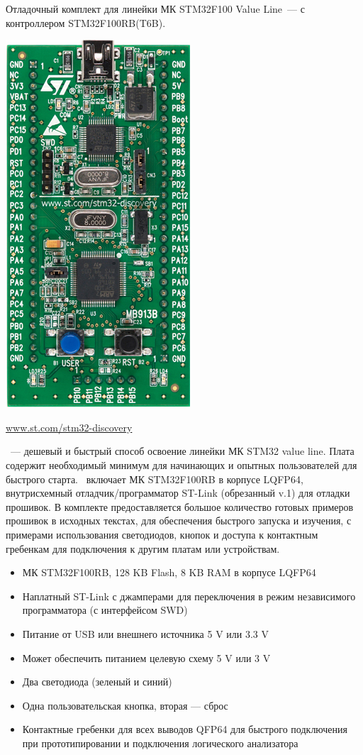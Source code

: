  \label{stm32f1} \secdown


Отладочный комплект для линейки МК STM32F100 Value 
Line\ --- с контроллером STM32F100RB(T6B).

\includegraphics[height=0.7\textheight]{vendors/STM32VLDISCOVERY.jpg}

\url{www.st.com/stm32-discovery}
\bigskip

\vld\ --- дешевый и быстрый способ освоение линейки МК STM32 
value line. 
Плата содержит необходимый минимум для начинающих и опытных пользователей
для быстрого старта.
\vld\ включает МК STM32F100RB в корпусе LQFP64, внутрисхемный 
отладчик/программатор ST-Link (обрезанный v.1) для отладки прошивок.
В комплекте предоставляется большое количество готовых примеров прошивок
в исходных текстах, для обеспечения быстрого запуска и изучения, с примерами
использования светодиодов, кнопок и доступа к контактным гребенкам
для подключения к другим платам или устройствам.

\bigskip
\begin{itemize}
\item МК STM32F100RB, 128 KB Flash, 8 KB RAM в корпусе LQFP64
\item Наплатный ST-Link с джамперами для переключения в режим независимого 
программатора (с интерфейсом SWD)
\item Питание от USB или внешнего источника 5 V или 3.3 V
\item Может обеспечить питанием целевую схему 5 V или 3 V
\item Два светодиода (зеленый и синий)
\item Одна пользовательская кнопка, вторая --- сброс
\item Контактные гребенки для всех выводов QFP64 для быстрого подключения
при прототипировании и подключения логического анализатора
\end{itemize}

\secup